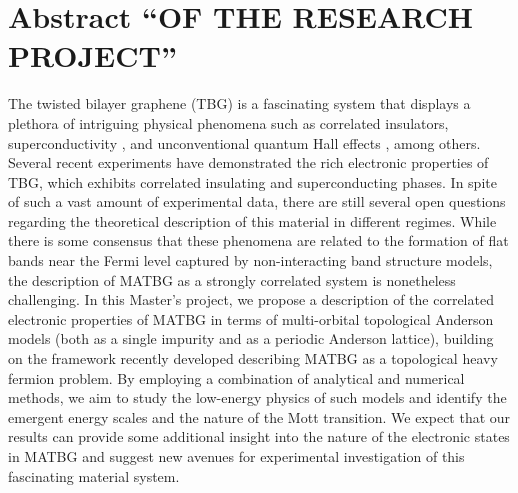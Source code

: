 \documentclass[12pt]{report}
\begin{document}
%
%
\geraTitulo
%
\folhaDeRosto
%
%
%
\tableofcontents
\thispagestyle{empty}
\clearpage
%

\sectionfont{\scshape}



\chapter{Abstract ``OF THE RESEARCH PROJECT''} \label{chp:abstract}

The twisted bilayer graphene (TBG) is a fascinating system that displays a plethora of intriguing physical phenomena such as correlated insulators, superconductivity \cite{cao2018}, and unconventional quantum Hall effects \cite{unconv_QHE_tbg_2006}, among others. Several recent experiments have demonstrated the rich electronic properties of TBG, which exhibits correlated insulating and superconducting phases. In spite of such a vast amount of experimental data, there are still several open questions regarding the theoretical description of this material in different regimes. While there is some consensus that these phenomena are related to the formation of flat bands near the Fermi level captured by non-interacting band structure models, the description of MATBG as a strongly correlated system is nonetheless challenging. In this Master's project, we propose a description of the correlated electronic properties of MATBG in terms of multi-orbital topological Anderson models (both as a single impurity and as a periodic Anderson lattice), building on the framework recently developed describing MATBG as a topological heavy fermion problem. By employing a combination of analytical and numerical methods, we aim to study the low-energy physics of such models and identify the emergent energy scales and the nature of the Mott transition. We expect that our results can provide some additional insight into the nature of the electronic states in MATBG and suggest new avenues for experimental investigation of this fascinating material system.
\end{document}
